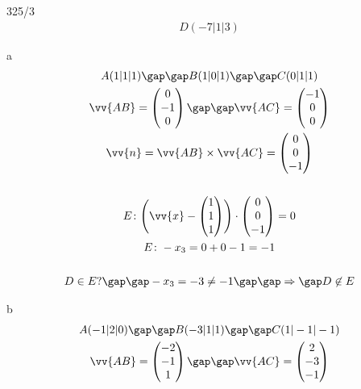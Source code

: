 \begin{exercise}{325/3}
  \begin{gather*}
    D(-7|1|3)
  \end{gather*}
  \item [a]
  \begin{gather*}
    A(1|1|1) \gap\gap B(1|0|1) \gap\gap C(0|1|1) \\
    \vv{AB} = \begin{pmatrix}0 \\ -1 \\ 0\end{pmatrix} \gap\gap \vv{AC} = \begin{pmatrix}-1 \\ 0 \\ 0\end{pmatrix} \\
    \vv{n} = \vv{AB} \times \vv{AC} = \begin{pmatrix}0 \\ 0 \\ -1\end{pmatrix} \\\\
    E \colon \Biggl(\vv{x} - \begin{pmatrix}1 \\ 1 \\ 1\end{pmatrix}\Biggr) \cdot \begin{pmatrix}0 \\ 0 \\ -1\end{pmatrix} = 0 \\
    E \colon -x_3 = 0 + 0 - 1 = -1 \\\\
    D \in E ? \gap\gap -x_3 = -3 \neq -1 \gap\gap \Rightarrow\gap D \not\in E
  \end{gather*}
  \item [b]
  \begin{gather*}
    A(-1|2|0) \gap\gap B(-3|1|1) \gap\gap C(1|-1|-1) \\
    \vv{AB} = \begin{pmatrix}-2 \\ -1 \\ 1\end{pmatrix} \gap\gap \vv{AC} = \begin{pmatrix}2 \\ -3 \\ -1\end{pmatrix} \\

\end{gather*}
\end{exercise}
